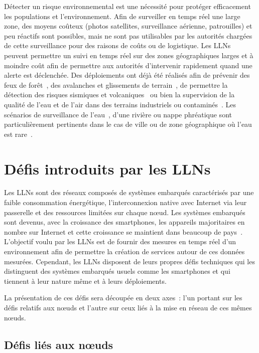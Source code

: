 Détecter un risque environnemental est une nécessité pour protéger efficacement les populations et l'environnement.
Afin de surveiller en temps réel une large zone, des moyens coûteux (photos satellites, surveillance aérienne, patrouilles) et peu réactifs sont possibles, mais ne sont pas utilisables par les autorités chargées de cette surveillance pour des raisons de coûts ou de logistique.
Les \ac{LLN}s peuvent permettre un suivi en temps réel sur des zones géographiques larges et à moindre coût afin de permettre aux autorités d'intervenir rapidement quand une alerte est déclenchée.
Des déploiements ont déjà été réalisés afin de prévenir des feux de forêt~\cite{yu2005real}, des avalanches et glissements de terrain~\cite{terzis2006slip, alippi2007adaptive}, de permettre la détection des risques sismiques et volcaniques~\cite{werner2006deploying} ou bien la supervision de la qualité de l'eau et de l'air dans des terrains industriels ou contaminés~\cite{khedo2010wireless, o2007smartcoast}.
Les scénarios de surveillance de l'eau~\cite{xiao2010smart}, d'une rivière ou nappe phréatique sont particulièrement pertinents dans le cas de ville ou de zone géographique où l'eau est rare~\cite{kerkez2012design}.

\section{Défis introduits par les \ac{LLN}s}
\label{intro:challenges}

Les \ac{LLN}s sont des réseaux composés de systèmes embarqués caractérisés par une faible consommation énergétique, l'interconnexion native avec Internet via leur passerelle et des ressources limitées sur chaque nœud.
Les systèmes embarqués sont devenus, avec la croissance des smartphones, les appareils majoritaires en nombre sur Internet et cette croissance se maintient dans beaucoup de pays~\cite{kim2007value}.
L'objectif voulu par les \ac{LLN}s est de fournir des mesures en temps réel d'un environnement afin de permettre la création de services autour de ces données mesurées.
Cependant, les \ac{LLN}s disposent de leurs propres défis techniques qui les distinguent des systèmes embarqués usuels comme les smartphones et qui tiennent à leur nature même et à leurs déploiements.

La présentation de ces défis sera découpée en deux axes~: l'un portant sur les défis relatifs aux nœuds et l'autre sur ceux liés à la mise en réseau de ces mêmes nœuds.

\subsection{Défis liés aux nœuds}

